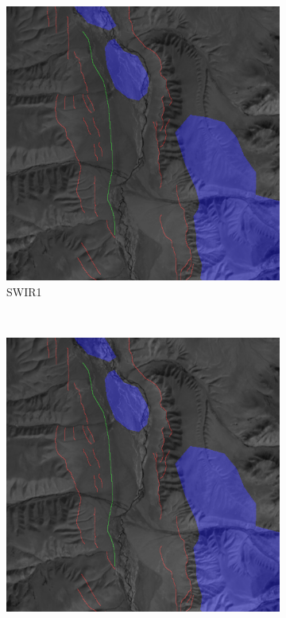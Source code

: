 \documentclass[11pt,a4paper]{article}
\begin{document}
\begin{figure}[t]
    \begin{subfigure}[b]{0.18\textwidth}
        \includegraphics[width=\textwidth]{graphics/data/0/features_swir1.png}
        \caption{SWIR1}
        \label{fig:features_swir1}
    \end{subfigure}
    ~
    \begin{subfigure}[b]{0.18\textwidth}
        \includegraphics[width=\textwidth]{graphics/data/0/features_swir2.png}

\end{subfigure}
\end{figure}
\end{document}
